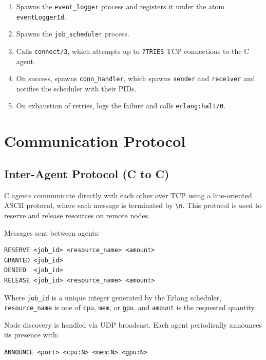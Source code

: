 \documentclass[12pt,a4paper]{article}
\begin{document}
\begin{enumerate}
  \item Spawns the \texttt{event\_logger} process and registers it under the atom \texttt{eventLoggerId}.
  \item Spawns the \texttt{job\_scheduler} process.
  \item Calls \texttt{connect/3}, which attempts up to \texttt{?TRIES} TCP connections to the C agent.
  \item On success, spawns \texttt{conn\_handler}, which spawns \texttt{sender} and \texttt{receiver}
        and notifies the scheduler with their PIDs.
  \item On exhaustion of retries, logs the failure and calls \texttt{erlang:halt/0}.
\end{enumerate}

\section{Communication Protocol}

\subsection{Inter-Agent Protocol (C to C)}

C agents communicate directly with each other over TCP using a line-oriented ASCII protocol, where each message is terminated by \texttt{\textbackslash n}. This protocol is used to reserve and release resources on remote nodes.

Messages sent between agents:

\begin{lstlisting}
RESERVE <job_id> <resource_name> <amount>
GRANTED <job_id>
DENIED  <job_id>
RELEASE <job_id> <resource_name> <amount>
\end{lstlisting}

Where \texttt{job\_id} is a unique integer generated by the Erlang scheduler,
\texttt{resource\_name} is one of \texttt{cpu}, \texttt{mem}, or \texttt{gpu},
and \texttt{amount} is the requested quantity.

Node discovery is handled via UDP broadcast. Each agent periodically announces
its presence with:

\begin{lstlisting}[language={}]
ANNOUNCE <port> <cpu:N> <mem:N> <gpu:N>
\end{lstlisting}
\end{document}
